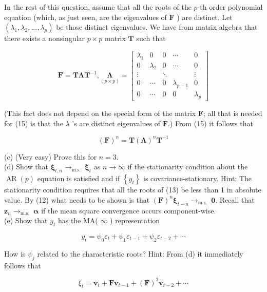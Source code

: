 \documentclass[10pt]{article}
\begin{document}
In the rest of this question, assume that all the roots of the $p$-th order polynomial equation (which, as just seen, are the eigenvalues of $\mathbf{F}$ ) are distinct. Let $\left(\lambda_{1}, \lambda_{2}, \ldots, \lambda_{p}\right)$ be those distinct eigenvalues. We have from matrix algebra that there exists a nonsingular $p \times p$ matrix $\mathbf{T}$ such that

\[
\mathbf{F}=\mathbf{T} \boldsymbol{\Lambda} \mathbf{T}^{-1}, \underset{(p \times p)}{\boldsymbol{\Lambda}}=\left[\begin{array}{ccccc}
\lambda_{1} & 0 & 0 & \cdots & 0  \tag{15}\\
0 & \lambda_{2} & 0 & \cdots & 0 \\
\vdots & & \ddots & & \vdots \\
0 & \cdots & 0 & \lambda_{p-1} & 0 \\
0 & \cdots & 0 & 0 & \lambda_{p}
\end{array}\right]
\]

(This fact does not depend on the special form of the matrix $\mathbf{F}$; all that is needed for (15) is that the $\lambda$ 's are distinct eigenvalues of $\mathbf{F}$.) From (15) it follows that

$$
(\mathbf{F})^{n}=\mathbf{T}(\mathbf{\Lambda})^{n} \mathbf{T}^{-1}
$$

(c) (Very easy) Prove this for $n=3$.\\
(d) Show that $\boldsymbol{\xi}_{t, n} \rightarrow_{\text {m.s. }} \boldsymbol{\xi}_{t}$ as $n \rightarrow \infty$ if the stationarity condition about the $\operatorname{AR}(p)$ equation is satisfied and if $\left\{y_{t}\right\}$ is covariance-stationary. Hint: The stationarity condition requires that all the roots of (13) be less than 1 in absolute value. By (12) what needs to be shown is that $(\mathbf{F})^{n} \boldsymbol{\xi}_{t-n} \rightarrow_{\text {m.s. }} \mathbf{0}$. Recall that $\mathbf{z}_{n} \rightarrow_{\text {m.s. }} \boldsymbol{\alpha}$ if the mean square convergence occurs component-wise.\\
(e) Show that $y_{t}$ has the MA( $\infty$ ) representation

$$
y_{t}=\psi_{0} \varepsilon_{t}+\psi_{1} \varepsilon_{t-1}+\psi_{2} \varepsilon_{t-2}+\cdots
$$

How is $\psi_{j}$ related to the characteristic roots? Hint: From (d) it immediately follows that

$$
\xi_{t}=\mathbf{v}_{t}+\mathbf{F} \mathbf{v}_{t-1}+(\mathbf{F})^{2} \mathbf{v}_{t-2}+\cdots
$$
\end{document}
